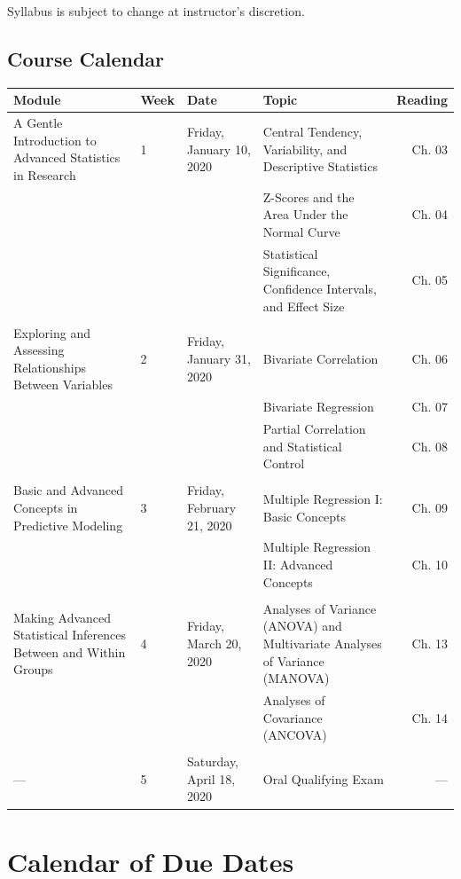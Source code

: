 \documentclass[
]{article}
\begin{document}
Syllabus is subject to change at instructor's discretion.

\newpage
\begin{landscape}

\section{Course Calendar}

\begin{tabularx}{\linewidth}{XlXXr}
\hline
\textbf{Module} & \textbf{Week} & \textbf{Date} & \textbf{Topic} & \textbf{Reading} \\
\hline
A Gentle Introduction to Advanced Statistics in Research & 1 & Friday, January 10, 2020 & Central Tendency, Variability, and Descriptive Statistics & Ch. 03 \\
 &  &  & Z-Scores and the Area Under the Normal Curve & Ch. 04 \\
 &  &  & Statistical Significance, Confidence Intervals, and Effect Size & Ch. 05 \\
 &  &  &  &  \\
Exploring and Assessing Relationships Between Variables & 2 & Friday, January 31, 2020 & Bivariate Correlation & Ch. 06 \\
 &  &  & Bivariate Regression & Ch. 07 \\
 &  &  & Partial Correlation and Statistical Control & Ch. 08 \\
 &  &  &  &  \\
Basic and Advanced Concepts in Predictive Modeling & 3 & Friday, February 21, 2020 & Multiple Regression I: Basic Concepts & Ch. 09 \\
 &  &  & Multiple Regression II: Advanced Concepts & Ch. 10 \\
 &  &  &  &  \\
Making Advanced Statistical Inferences Between and Within Groups & 4 & Friday, March 20, 2020 & Analyses of Variance (ANOVA) and Multivariate Analyses of Variance (MANOVA) & Ch. 13 \\
 &  &  & Analyses of Covariance (ANCOVA) & Ch. 14 \\
 &  &  &  &  \\
--- & 5 & Saturday, April 18, 2020 & Oral Qualifying Exam & --- \\
\hline
\end{tabularx}

\end{landscape}

\newpage
\section{Calendar of Due Dates}
\end{document}
